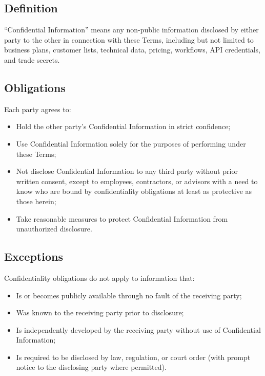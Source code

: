 \documentclass[11pt,letterpaper,parskip=half]{scrartcl}
\begin{document}
\subsection{Definition}

``Confidential Information'' means any non-public information disclosed by either party to the other in connection with these Terms, including but not limited to business plans, customer lists, technical data, pricing, workflows, API credentials, and trade secrets.

\subsection{Obligations}

Each party agrees to:

\begin{itemize}[nosep, leftmargin=1.5em]
    \item Hold the other party's Confidential Information in strict confidence;
    \item Use Confidential Information solely for the purposes of performing under these Terms;
    \item Not disclose Confidential Information to any third party without prior written consent, except to employees, contractors, or advisors with a need to know who are bound by confidentiality obligations at least as protective as those herein;
    \item Take reasonable measures to protect Confidential Information from unauthorized disclosure.
\end{itemize}

\subsection{Exceptions}

Confidentiality obligations do not apply to information that:

\begin{itemize}[nosep, leftmargin=1.5em]
    \item Is or becomes publicly available through no fault of the receiving party;
    \item Was known to the receiving party prior to disclosure;
    \item Is independently developed by the receiving party without use of Confidential Information;
    \item Is required to be disclosed by law, regulation, or court order (with prompt notice to the disclosing party where permitted).
\end{itemize}
\end{document}

